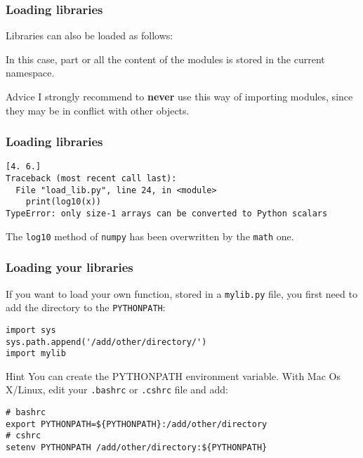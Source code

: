 \begin{frame}[fragile]
    \frametitle{Loading libraries}
    Libraries can also be loaded as follows:
    
    In this case, part or all the content of the modules is stored in the current namespace.
    \begin{alertblock}{Advice}
I strongly recommend to \textbf{never} use this way of importing modules, since they may be in conflict with other objects.
    \end{alertblock}
\end{frame}

\begin{frame}[fragile]
    \frametitle{Loading libraries}
    
    \vspace{1em}
    \scriptsize
    \begin{verbatim}
[4. 6.]
Traceback (most recent call last):
  File "load_lib.py", line 24, in <module>
    print(log10(x))
TypeError: only size-1 arrays can be converted to Python scalars
    \end{verbatim}
    \normalsize
    
    The \verb+log10+ method of \verb+numpy+ has been overwritten by the \verb+math+ one.

\end{frame}

\begin{frame}[fragile]
\frametitle{Loading your libraries}
    If you want to load your own function, stored in a \verb+mylib.py+ file, you first need to add the directory to the \verb+PYTHONPATH+:
    \begin{lstlisting}[basicstyle=\ttfamily\scriptsize]
import sys
sys.path.append('/add/other/directory/')
import mylib
\end{lstlisting}

\begin{block}{Hint}
    \small
You can create the PYTHONPATH environment variable. With Mac Os X/Linux,  edit your \verb+.bashrc+ or \verb+.cshrc+ file and add:
\begin{verbatim}
# bashrc
export PYTHONPATH=${PYTHONPATH}:/add/other/directory
# cshrc
setenv PYTHONPATH /add/other/directory:${PYTHONPATH}
\end{verbatim}
\end{block}
\end{frame}



